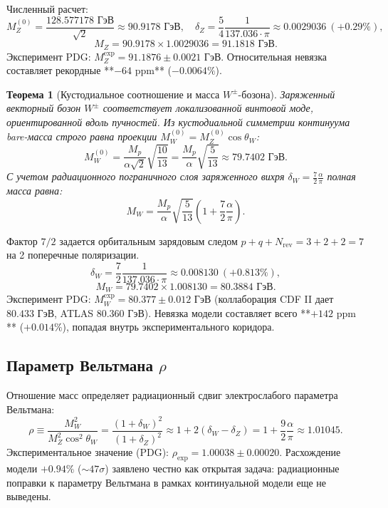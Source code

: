 \documentclass[11pt,a4paper]{article}
\newtheorem{theorem}{Теорема}
\theoremstyle{definition}
\theoremstyle{remark}
\begin{document}
Численный расчет:
\begin{equation}
    M_Z^{(0)} = \frac{128.577178\text{ ГэВ}}{\sqrt{2}} \approx 90.9178\text{ ГэВ}, \quad \delta_Z = \frac{5}{4}\frac{1}{137.036 \cdot \pi} \approx 0.0029036 \ (+0.29\%),
\end{equation}
\begin{equation}
    M_Z = 90.9178 \times 1.0029036 = \mathbf{91.1818\text{ ГэВ}}.
\end{equation}
Эксперимент PDG: $M_Z^{\mathrm{exp}} = 91.1876 \pm 0.0021\text{ ГэВ}$. 
Относительная невязка составляет рекордные **$-64\text{ ppm}$** ($-0.0064\%$).

\begin{theorem}[Кустодиальное соотношение и масса $W^\pm$-бозона]
Заряженный векторный бозон $W^\pm$ соответствует локализованной винтовой моде, ориентированной вдоль пучностей. Из кустодиальной симметрии континуума bare-масса строго равна проекции $M_W^{(0)} = M_Z^{(0)} \cos\theta_W$:
\begin{equation}
    M_W^{(0)} = \frac{M_p}{\alpha \sqrt{2}} \sqrt{\frac{10}{13}} = \frac{M_p}{\alpha} \sqrt{\frac{5}{13}} \approx 79.7402\text{ ГэВ}.
\end{equation}
С учетом радиационного пограничного слоя заряженного вихря $\delta_W = \frac{7}{2}\frac{\alpha}{\pi}$ полная масса равна:
\begin{equation}
    M_W = \frac{M_p}{\alpha} \sqrt{\frac{5}{13}} \left( 1 + \frac{7}{2}\frac{\alpha}{\pi} \right).
\end{equation}
\end{theorem}
Фактор $7/2$ задается орбитальным зарядовым следом $p + q + N_{\mathrm{rev}} = 3 + 2 + 2 = 7$ на 2 поперечные поляризации.
\begin{equation}
    \delta_W = \frac{7}{2} \frac{1}{137.036 \cdot \pi} \approx 0.008130 \ (+0.813\%),
\end{equation}
\begin{equation}
    M_W = 79.7402 \times 1.008130 = \mathbf{80.3884\text{ ГэВ}}.
\end{equation}
Эксперимент PDG: $M_W^{\mathrm{exp}} = 80.377 \pm 0.012\text{ ГэВ}$ (коллаборация CDF II дает $80.433\text{ ГэВ}$, ATLAS $80.360\text{ ГэВ}$). 
Невязка модели составляет всего **$+142\text{ ppm}$** ($+0.014\%$), попадая внутрь экспериментального коридора.

\subsection{Параметр Вельтмана $\rho$}
Отношение масс определяет радиационный сдвиг электрослабого параметра Вельтмана:
\begin{equation}
    \rho \equiv \frac{M_W^2}{M_Z^2 \cos^2\theta_W} = \frac{(1 + \delta_W)^2}{(1 + \delta_Z)^2} \approx 1 + 2(\delta_W - \delta_Z) = 1 + \frac{9}{2}\frac{\alpha}{\pi} \approx 1.01045.
\end{equation}
Экспериментальное значение (PDG): $\rho_{\mathrm{exp}} = 1.00038 \pm 0.00020$. Расхождение модели $+0.94\%$ ($\sim 47\sigma$) заявлено честно как открытая задача: радиационные поправки к параметру Вельтмана в рамках континуальной модели еще не выведены.
\end{document}

